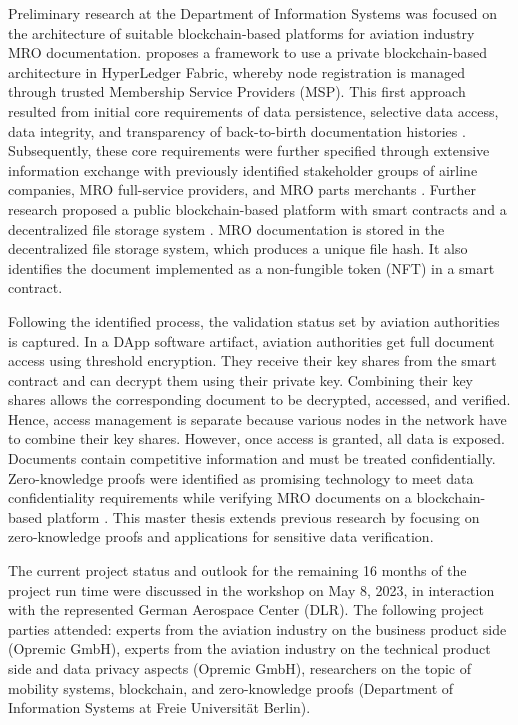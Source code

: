 Preliminary research at the Department of Information Systems was focused on the architecture of suitable blockchain-based platforms for aviation industry MRO documentation. \citet{WickboldtMeiseKliewer} proposes a framework to use a private blockchain-based architecture in HyperLedger Fabric, whereby node registration is managed through trusted Membership Service Providers (MSP). This first approach resulted from initial core requirements of data persistence, selective data access, data integrity, and transparency of back-to-birth documentation histories \citep{WickboldtClemens2018BzdD}. Subsequently, these core requirements were further specified through extensive information exchange with previously identified stakeholder groups of airline companies, MRO full-service providers, and MRO parts merchants \citep{ZedelJ}. Further research proposed a public blockchain-based platform with smart contracts and a decentralized file storage system \citep{ZedelJ}. MRO documentation is stored in the decentralized file storage system, which produces a unique file hash. It also identifies the document implemented as a non-fungible token (NFT) in a smart contract.

Following the identified process, the validation status set by aviation authorities is captured. In a DApp software artifact, aviation authorities get full document access using threshold encryption. They receive their key shares from the smart contract and can decrypt them using their private key. Combining their key shares allows the corresponding document to be decrypted, accessed, and verified. Hence, access management is separate because various nodes in the network have to combine their key shares. However, once access is granted, all data is exposed. Documents contain competitive information and must be treated confidentially. Zero-knowledge proofs were identified as promising technology to meet data confidentiality requirements while verifying MRO documents on a blockchain-based platform \citep{ZedelJ}. This master thesis extends previous research by focusing on zero-knowledge proofs and applications for sensitive data verification.

The current project status and outlook for the remaining 16 months of the project run time were discussed in the workshop on May 8, 2023, in interaction with the represented German Aerospace Center (DLR). The following project parties attended: experts from the aviation industry on the business product side (Opremic GmbH), experts from the aviation industry on the technical product side and data privacy aspects (Opremic GmbH), researchers on the topic of mobility systems, blockchain, and zero-knowledge proofs (Department of Information Systems at Freie Universit{\"a}t Berlin). 

